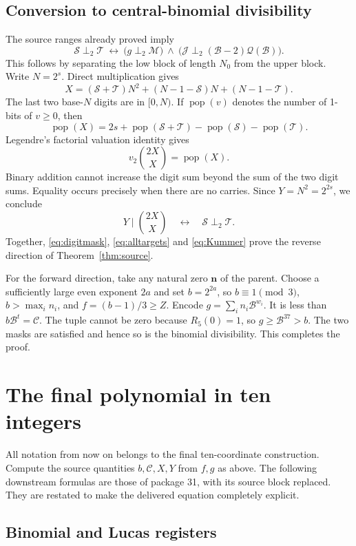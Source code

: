 \documentclass[11pt,letterpaper]{article}
\theoremstyle{definition}\newtheorem{definition}[theorem]{Definition}
\theoremstyle{remark}\newtheorem{remark}[theorem]{Remark}
\newcommand{\pop}{\operatorname{pop}}
\newcommand{\cB}{\mathcal B}
\newcommand{\cC}{\mathcal C}
\newcommand{\cJ}{\mathcal J}
\newcommand{\cM}{\mathcal M}
\newcommand{\cQ}{\mathcal Q}
\newcommand{\cS}{\mathcal S}
\newcommand{\cT}{\mathcal T}
\begin{document}
\subsection{Conversion to central-binomial divisibility}

The source ranges already proved imply
\[
 \cS\perp_2\cT
 \ \longleftrightarrow\
 \bigl(g\perp_2\cM\bigr)\ \land\
 \bigl(\cJ\perp_2(\cB-2)\cQ(\cB)\bigr).
\]
This follows by separating the low block of length $N_0$ from the upper block. Write $N=2^s$. Direct multiplication gives
\begin{equation}\label{eq:Xdigits}
 X=(\cS+\cT)N^2+(N-1-\cS)N+(N-1-\cT).
\end{equation}
The last two base-$N$ digits are in $[0,N)$. If $\pop(v)$ denotes the number of 1-bits of $v\ge0$, then
\[
 \pop(X)=2s+\pop(\cS+\cT)-\pop(\cS)-\pop(\cT).
\]
Legendre's factorial valuation identity gives
\[
 v_2\binom{2X}{X}=\pop(X).
\]
Binary addition cannot increase the digit sum beyond the sum of the two digit sums. Equality occurs precisely when there are no carries. Since $Y=N^2=2^{2s}$, we conclude
\begin{equation}\label{eq:Kummer}
 Y\mid\binom{2X}{X}\quad\longleftrightarrow\quad\cS\perp_2\cT.
\end{equation}
Together, \eqref{eq:digitmask}, \eqref{eq:alltargets} and \eqref{eq:Kummer} prove the reverse direction of Theorem~\ref{thm:source}.

For the forward direction, take any natural zero $\mathbf n$ of the parent. Choose a sufficiently large even exponent $2a$ and set $b=2^{2a}$, so $b\equiv1\pmod3$, $b>\max_i n_i$, and $f=(b-1)/3\ge Z$. Encode $g=\sum_i n_i\cB^{w_i}$. It is less than $b\cB^t=\cC$. The tuple cannot be zero because $R_5(0)=1$, so $g\ge\cB^{37}>b$. The two masks are satisfied and hence so is the binomial divisibility. This completes the proof.

\section{The final polynomial in ten integers}\label{sec:final}

All notation from now on belongs to the final ten-coordinate construction. Compute the source quantities $b,\cC,X,Y$ from $f,g$ as above. The following downstream formulas are those of package 31, with its source block replaced. They are restated to make the delivered equation completely explicit.

\subsection{Binomial and Lucas registers}
\end{document}
